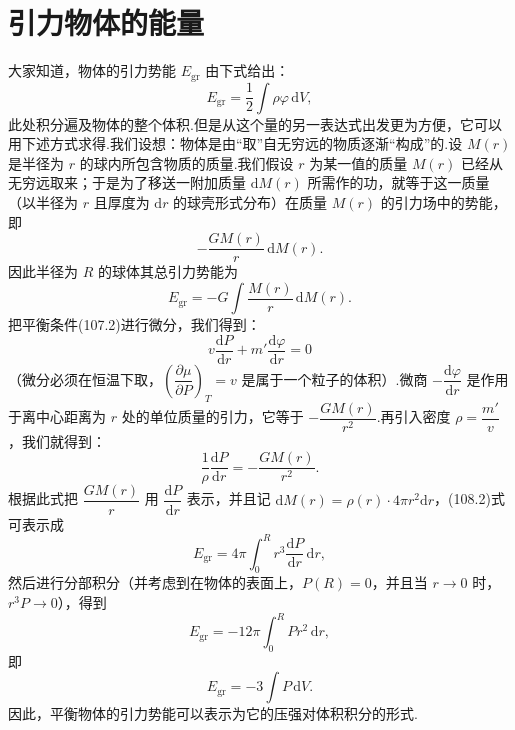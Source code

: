 \section{引力物体的能量}

大家知道，物体的引力势能 $E_{\mathrm{gr}}$ 由下式给出：
\begin{equation}
  E_{\mathrm{gr}}=\frac12\int\rho\varphi\,\mathrm{d}V,
\end{equation}
此处积分遍及物体的整个体积.但是从这个量的另一表达式出发更为方便，它可以用下述方式求得.我们设想：物体是由“取”自无穷远的物质逐渐“构成”的.设 $M(r)$ 是半径为 $r$ 的球内所包含物质的质量.我们假设 $r$ 为某一值的质量 $M(r)$ 已经从无穷远取来；于是为了移送一附加质量 $\mathrm{d}M(r)$ 所需作的功，就等于这一质量（以半径为 $r$ 且厚度为 $\mathrm{d}r$ 的球壳形式分布）在质量 $M(r)$ 的引力场中的势能，即
\begin{equation*}
  -\frac{GM(r)}{r}\,\mathrm{d}M(r).
\end{equation*}
因此半径为 $R$ 的球体其总引力势能为
\begin{equation}
  E_{\mathrm{gr}}=-G\int\frac{M(r)}{r}\,\mathrm{d}M(r).
\end{equation}
把平衡条件(107.2)进行微分，我们得到：
\begin{equation*}
  v\frac{\mathrm{d}P}{\mathrm{d}r}
  +m'\frac{\mathrm{d}\varphi}{\mathrm{d}r}=0
\end{equation*}
（微分必须在恒温下取，$\left(\dfrac{\partial\mu}{\partial P}\right)_T=v$ 是属于一个粒子的体积）.微商 $-\dfrac{\mathrm{d}\varphi}{\mathrm{d}r}$ 是作用于离中心距离为 $r$ 处的单位质量的引力，它等于 $-\dfrac{GM(r)}{r^2}$.再引入密度 $\rho=\dfrac{m'}{v}$，我们就得到：
\begin{equation}
  \frac{1}{\rho}\frac{\mathrm{d}P}{\mathrm{d}r}
  =-\frac{GM(r)}{r^2}.
\end{equation}
根据此式把 $\dfrac{GM(r)}{r}$ 用 $\dfrac{\mathrm{d}P}{\mathrm{d}r}$ 表示，并且记 $\mathrm{d}M(r)=\rho(r)\cdot4\pi r^2\mathrm{d}r$，(108.2)式可表示成
\begin{equation*}
  E_{\mathrm{gr}}=4\pi\int_0^R r^3\frac{\mathrm{d}P}{\mathrm{d}r}\,
  \mathrm{d}r,
\end{equation*}
然后进行分部积分（并考虑到在物体的表面上，$P(R)=0$，并且当 $r\to0$ 时，$r^3P\to0$），得到
\begin{equation*}
  E_{\mathrm{gr}}=-12\pi\int_0^R Pr^2\,\mathrm{d}r,
\end{equation*}
即
\begin{equation}
  E_{\mathrm{gr}}=-3\int P\,\mathrm{d}V.
\end{equation}
因此，平衡物体的引力势能可以表示为它的压强对体积积分的形式.

